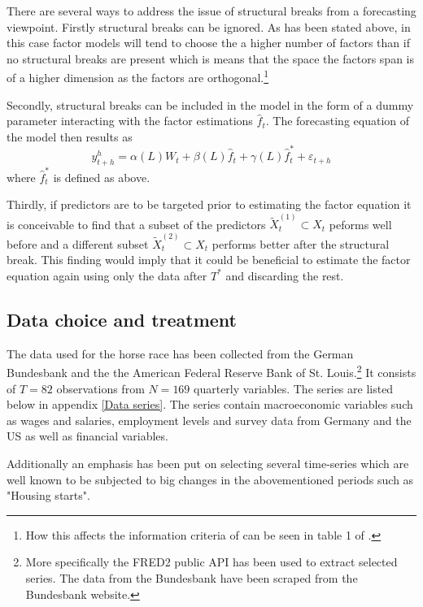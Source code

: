 \documentclass[11pt]{article}
\begin{document}
There are several ways to address the issue of structural breaks from a forecasting viewpoint. Firstly structural breaks can be ignored. As has been stated above, in this case factor models will tend to choose the a higher number of factors than if no structural breaks are present which is means that the space the factors span is of a higher dimension as the factors are orthogonal.\footnote{How this affects the information criteria of \citet{bai2002determining} can be seen in table 1 of \citet{breitung2011testing}.}

Secondly, structural breaks can be included in the model in the form of a dummy parameter interacting with the factor estimations $\hat f_t$. The forecasting equation of the model then results as
\begin{equation}
	\label{forecasting, structural breaks}
	y^h_{t+h} = \alpha(L) W_t + \beta(L) \hat f_t + \gamma(L) \hat f_t^* + \varepsilon_{t+h}
\end{equation}
where $\hat f_t^*$ is defined as above.

Thirdly, if predictors are to be targeted prior to estimating the factor equation it is conceivable to find that a subset of the predictors $\tilde X_t^{(1)} \subset X_t$ peforms well before and a different subset $\tilde X_t^{(2)} \subset X_t$ performs better after the structural break. This finding would imply that it could be beneficial to estimate the factor equation again using only the data after $T^*$ and discarding the rest.


\subsection{Data choice and treatment}
The data used for the horse race has been collected from the German Bundesbank and the the American Federal Reserve Bank of St. Louis.\footnote{More specifically the FRED2 public API has been used to extract selected series. The data from the Bundesbank have been scraped from the Bundesbank website.}  It consists of $T=82$ observations from $N=169$ quarterly variables. The series are listed below in appendix \ref{Data series}. The series contain macroeconomic variables such as wages and salaries, employment levels and survey data from Germany and the US as well as financial variables.

Additionally an emphasis has been put on selecting several time-series which are well known to be subjected to big changes in the abovementioned periods such as "Housing starts".
\end{document}
